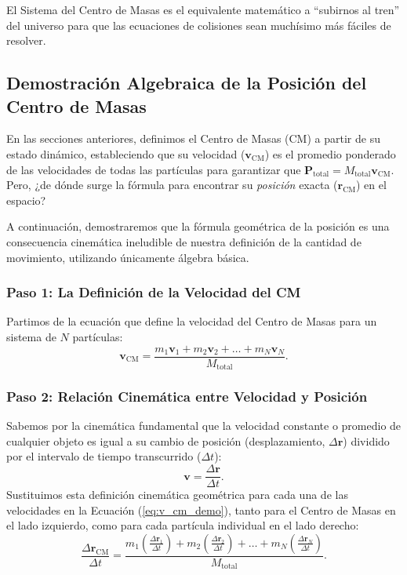 \documentclass[11pt,a4paper]{book}
\begin{document}
El Sistema del Centro de Masas es el equivalente matemático a ``subirnos al tren'' del universo para que las ecuaciones de colisiones sean muchísimo más fáciles de resolver.

\subsection{Demostración Algebraica de la Posición del Centro de Masas}

En las secciones anteriores, definimos el Centro de Masas (CM) a partir de su estado dinámico, estableciendo que su velocidad ($\boldsymbol{v}_{\text{CM}}$) es el promedio ponderado de las velocidades de todas las partículas para garantizar que $\boldsymbol{P}_{\text{total}} = M_{\text{total}} \boldsymbol{v}_{\text{CM}}$. Pero, ¿de dónde surge la fórmula para encontrar su \textit{posición} exacta ($\boldsymbol{r}_{\text{CM}}$) en el espacio?

A continuación, demostraremos que la fórmula geométrica de la posición es una consecuencia cinemática ineludible de nuestra definición de la cantidad de movimiento, utilizando únicamente álgebra básica.

\subsubsection{Paso 1: La Definición de la Velocidad del CM}

Partimos de la ecuación que define la velocidad del Centro de Masas para un sistema de $N$ partículas:
\begin{equation}
    \boldsymbol{v}_{\text{CM}} = \frac{m_1\boldsymbol{v}_1 + m_2\boldsymbol{v}_2 + \dots + m_N\boldsymbol{v}_N}{M_{\text{total}}}.
    \label{eq:v_cm_demo}
\end{equation}

\subsubsection{Paso 2: Relación Cinemática entre Velocidad y Posición}

Sabemos por la cinemática fundamental que la velocidad constante o promedio de cualquier objeto es igual a su cambio de posición (desplazamiento, $\Delta\boldsymbol{r}$) dividido por el intervalo de tiempo transcurrido ($\Delta t$):
\begin{equation}
    \boldsymbol{v} = \frac{\Delta \boldsymbol{r}}{\Delta t}.
\end{equation}
Sustituimos esta definición cinemática geométrica para cada una de las velocidades en la Ecuación (\ref{eq:v_cm_demo}), tanto para el Centro de Masas en el lado izquierdo, como para cada partícula individual en el lado derecho:
\begin{equation}
    \frac{\Delta \boldsymbol{r}_{\text{CM}}}{\Delta t} = \frac{m_1\left(\frac{\Delta \boldsymbol{r}_1}{\Delta t}\right) + m_2\left(\frac{\Delta \boldsymbol{r}_2}{\Delta t}\right) + \dots + m_N\left(\frac{\Delta \boldsymbol{r}_N}{\Delta t}\right)}{M_{\text{total}}}.
\end{equation}
\end{document}
